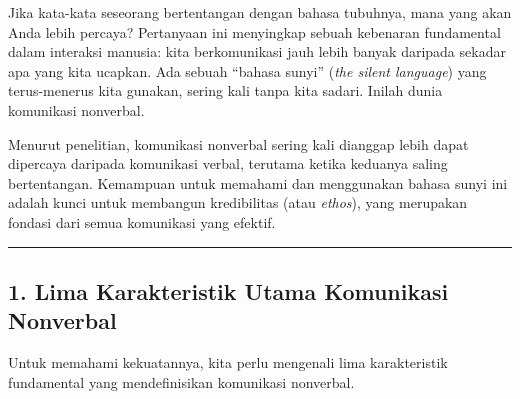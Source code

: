 \documentclass[
  letterpaper,
  DIV=11,
  numbers=noendperiod]{scrreprt}
\begin{document}
Jika kata-kata seseorang bertentangan dengan bahasa tubuhnya, mana yang
akan Anda lebih percaya? Pertanyaan ini menyingkap sebuah kebenaran
fundamental dalam interaksi manusia: kita berkomunikasi jauh lebih
banyak daripada sekadar apa yang kita ucapkan. Ada sebuah ``bahasa
sunyi'' (\emph{the silent language}) yang terus-menerus kita gunakan,
sering kali tanpa kita sadari. Inilah dunia komunikasi nonverbal.

Menurut penelitian, komunikasi nonverbal sering kali dianggap lebih
dapat dipercaya daripada komunikasi verbal, terutama ketika keduanya
saling bertentangan. Kemampuan untuk memahami dan menggunakan bahasa
sunyi ini adalah kunci untuk membangun kredibilitas (atau \emph{ethos}),
yang merupakan fondasi dari semua komunikasi yang efektif.

\begin{center}\rule{0.5\linewidth}{0.5pt}\end{center}

\subsection{1. Lima Karakteristik Utama Komunikasi
Nonverbal}\label{lima-karakteristik-utama-komunikasi-nonverbal}

Untuk memahami kekuatannya, kita perlu mengenali lima karakteristik
fundamental yang mendefinisikan komunikasi nonverbal.
\end{document}
